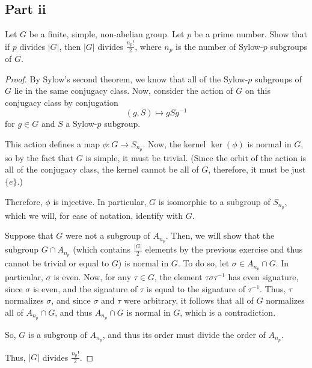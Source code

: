 \documentclass[12pt,reqno]{amsart}
\newcommand{\inv}{^{-1}}
\begin{document}
\subsection*{Part ii}
Let $G$ be a finite, simple, non-abelian group. Let $p$ be a prime number. Show
that if $p$ divides $|G|$, then $|G|$ divides $\frac{n_p!}{2}$, where $n_p$ is
the number of Sylow-$p$ subgroups of $G$.
\\
\begin{proof}
By Sylow's second theorem, we know that all of the Sylow-$p$ subgroups of $G$
    lie in the same conjugacy class. Now, consider the action of $G$ on this
    conjugacy class by conjugation
    \[
        (g,S)\mapsto gSg\inv
    \]
    for $g\in G$ and $S$ a Sylow-$p$ subgroup.

    This action defines a map $\phi:G\to S_{n_p}$.
    Now, the kernel $\ker(\phi)$ is normal in $G$, so by the fact that $G$ is
    simple, it must be trivial. (Since the orbit of the action is all of the
    conjugacy class, the kernel cannot be all of $G$, therefore, it must be just
    $\{e\}$.)

    Therefore, $\phi$ is injective. In particular, $G$ is isomorphic to a
    subgroup of $S_{n_p}$, which we will, for ease of notation, identify with
    $G$.
    
    Suppose that $G$ were not a subgroup of $A_{n_p}$. Then, we will show that
    the subgroup $G\cap A_{n_p}$ (which contains $\frac{|G|}{2}$ elements by the
    previous exercise and thus cannot be trivial or equal to $G$) is normal in
    $G$. To do so, let $\sigma\in A_{n_p}\cap G$. In particular, $\sigma$ is
    even.
    Now, for any $\tau\in G$, the element $\tau\sigma\tau\inv$ has even
    signature, since $\sigma$ is even, and the signature of $\tau$ is equal to
    the signature of $\tau\inv$. Thus, $\tau$ normalizes $\sigma$, and since
    $\sigma$ and $\tau$ were arbitrary, it follows that all of $G$ normalizes
    all of $A_{n_p}\cap G$, and thus $A_{n_p}\cap G$ is normal in $G$, which is 
    a contradiction.

    So, $G$ is a subgroup of $A_{n_p}$, and thus its order must divide the order
    of $A_{n_p}$.

    Thus, $|G|$ divides $\frac{n_p!}{2}$.
\end{proof}
\end{document}
